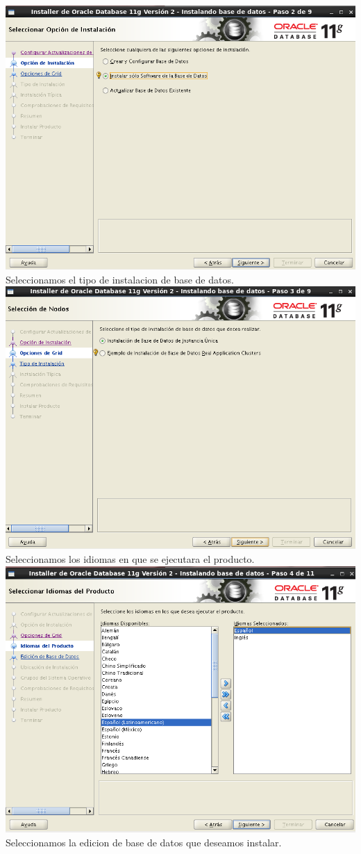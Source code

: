 \documentclass[12pt,letterpaper]{article}
\begin{document}
\begin{center}
\includegraphics[width=15cm]{./oraclelinux/13.png}\\
Seleccionamos el tipo de instalacion de base de datos.\\
\includegraphics[width=15cm]{./oraclelinux/14.png}\\
Seleccionamos los idiomas en que se ejecutara el producto.\\
\includegraphics[width=15cm]{./oraclelinux/15.png}\\
Seleccionamos la edicion de base de datos que deseamos instalar.\\
\end{center}
\end{document}
